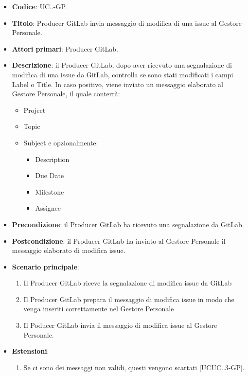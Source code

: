 			\begin{itemize}
				\item \textbf{Codice}: UC\theuccount.\thesubuccount.\thesubsubuccount-GP.
				\item \textbf{Titolo}: Producer GitLab invia messaggio di modifica di una issue al Gestore Personale.
				\item \textbf{Attori primari}: Producer GitLab.
				\item \textbf{Descrizione}: il Producer GitLab, dopo aver ricevuto una segnalazione di modifica di una issue da GitLab, controlla se sono stati modificati i campi Label o Title.
				In caso positivo, viene inviato un messaggio elaborato al Gestore Personale, il quale conterrà:
				\begin{itemize}
					\item Project
					\item Topic
					\item Subject e opzionalmente:
					\begin{itemize}
						\item Description
						\item Due Date
						\item Milestone
						\item Assignee
					\end{itemize}
				\end{itemize}
				\item \textbf{Precondizione}: il Producer GitLab ha ricevuto una segnalazione da GitLab.
				\item \textbf{Postcondizione}: il Producer GitLab ha inviato al Gestore Personale il messaggio elaborato di modifica issue.
				\item \textbf{Scenario principale}: 
				\begin{enumerate}
					\item Il Producer GitLab riceve la segnalazione di modifica issue da GitLab
					\item Il Producer GitLab prepara il messaggio di modifica issue in modo che venga inseriti correttamente nel Gestore Personale
					\item Il Poducer GitLab invia il messaggio di modifica issue al Gestore Personale.
				\end{enumerate}
				\item \textbf{Estensioni}: 
				\begin{enumerate}
					\item Se ci sono dei messaggi non validi, questi vengono scartati [UCUC\theuccount.\thesubuccount.3-GP].
				\end{enumerate}
			\end{itemize}
		

